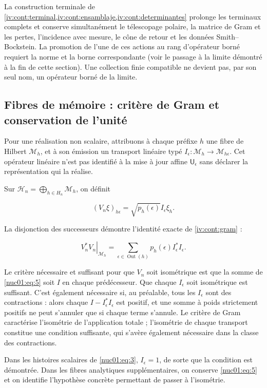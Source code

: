 La construction terminale de \cref{iv:cont:terminal,iv:cont:ensamblaje,iv:cont:determinantes} prolonge les terminaux complets et conserve simultanément le télescopage polaire, la matrice de Gram et les pertes, l’incidence avec mesure, le cône de retour et les données Smith–Bockstein. La promotion de l’une de ces actions au rang d’opérateur borné requiert la norme et la borne correspondante (voir le passage à la limite démontré à la fin de cette section). Une collection finie compatible ne devient pas, par son seul nom, un opérateur borné de la limite.

\subsection{Fibres de mémoire : critère de Gram et conservation de l’unité}

Pour une réalisation non scalaire, attribuons à chaque préfixe \(h\) une fibre de Hilbert \(\mathscr M_h\), et à son émission un transport linéaire typé
\(I_\epsilon:\mathscr M_h\to\mathscr M_{h\epsilon}\). Cet opérateur linéaire n’est pas identifié à la mise à jour affine \(\mathsf U_\epsilon\) sans déclarer la représentation qui la réalise.


Sur \(\mathscr H_n=\bigoplus_{h\in H_n}\mathscr M_h\), on définit

\[
(V_n\xi)_{h\epsilon}=\sqrt{p_h(\epsilon)}I_\epsilon\xi_h.
\]

La disjonction des successeurs démontre l’identité exacte de \cref{iv:cont:gram} :

\begin{equation}
\left.V_n^*V_n\right|_{\mathscr M_h}
=\sum_{\epsilon\in\operatorname{Out}(h)}p_h(\epsilon)I_\epsilon^*I_\epsilon.
\label{nuc01:eq:5}
\end{equation}

Le critère nécessaire et suffisant pour que \(V_n\) soit isométrique est que la somme de \eqref{nuc01:eq:5} soit \(I\) en chaque prédécesseur. Que chaque \(I_\epsilon\) soit isométrique est suffisant. C’est également nécessaire si, au préalable, tous les \(I_\epsilon\) sont des contractions : alors chaque \(I-I_\epsilon^*I_\epsilon\) est positif, et une somme à poids strictement positifs ne peut s’annuler que si chaque terme s’annule. Le critère de Gram caractérise l’isométrie de l’application totale ; l’isométrie de chaque transport constitue une condition suffisante, qui s’avère également nécessaire dans la classe des contractions.

Dans les histoires scalaires de \eqref{nuc01:eq:3}, \(I_\epsilon=1\), de sorte que la condition est démontrée. Dans les fibres analytiques supplémentaires, on conserve \eqref{nuc01:eq:5} et on identifie l’hypothèse concrète permettant de passer à l’isométrie.

